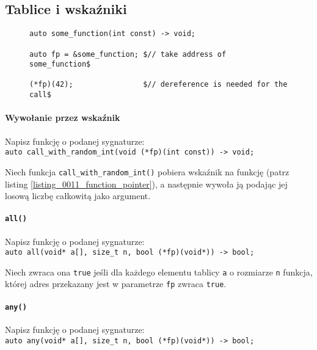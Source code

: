 \documentclass[11pt,a4paper,titlepage,onecolumn]{article}
\begin{document}
\subsection{Tablice i wskaźniki}

\begin{figure}[!htp]
{\small
\begin{lstlisting}[caption={wskaźnik do funkcji},
    captionpos=b,
    label=listing_0011_function_pointer]
auto some_function(int const) -> void;

auto fp = &some_function; $// take address of some_function$

(*fp)(42);                $// dereference is needed for the call$
\end{lstlisting}}
\end{figure}

\paragraph{Wywołanie przez wskaźnik} Napisz funkcję o podanej sygnaturze:\\
\texttt{auto call\_with\_random\_int(void (*fp)(int const)) -> void;}

Niech funkcja \texttt{call\_with\_random\_int()} pobiera wskaźnik na funkcję
(patrz listing \ref{listing_0011_function_pointer}), a następnie wywoła ją
podając jej losową liczbę całkowitą jako argument.

\paragraph{\texttt{all()}} Napisz funkcję o podanej sygnaturze:\\
\texttt{auto all(void* a[], size\_t n, bool (*fp)(void*)) -> bool;}

Niech zwraca ona \texttt{true} jeśli dla każdego elementu tablicy \texttt{a} o
rozmiarze \texttt{n} funkcja, której adres przekazany jest w parametrze
\texttt{fp} zwraca \texttt{true}.

\paragraph{\texttt{any()}} Napisz funkcję o podanej sygnaturze:\\
\texttt{auto any(void* a[], size\_t n, bool (*fp)(void*)) -> bool;}
\end{document}
